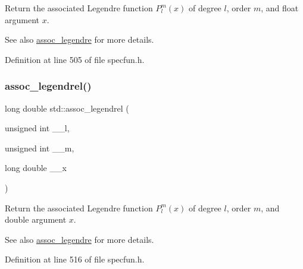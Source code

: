 Return the associated Legendre function $ P_l^m(x) $ of degree $ l $, order $ m $, and {\ttfamily float} argument $ x $.

\begin{DoxySeeAlso}{See also}
\hyperlink{group__cxx17__math__spec__func_ga7aa4182446f687094b12688078517d53}{assoc\+\_\+legendre} for more details. 
\end{DoxySeeAlso}


Definition at line 505 of file specfun.\+h.

\mbox{\label{group__cxx17__math__spec__func_ga55977b425a539146f060dec1c8003344}} 
\subsubsection{\texorpdfstring{assoc\+\_\+legendrel()}{assoc\_legendrel()}}
{\footnotesize\ttfamily long double std\+::assoc\+\_\+legendrel (\begin{DoxyParamCaption}\item[{unsigned int}]{\+\_\+\+\_\+l,  }\item[{unsigned int}]{\+\_\+\+\_\+m,  }\item[{long double}]{\+\_\+\+\_\+x }\end{DoxyParamCaption})\hspace{0.3cm}{\ttfamily [inline]}}

Return the associated Legendre function $ P_l^m(x) $ of degree $ l $, order $ m $, and { double} argument $ x $.

\begin{DoxySeeAlso}{See also}
\hyperlink{group__cxx17__math__spec__func_ga7aa4182446f687094b12688078517d53}{assoc\+\_\+legendre} for more details. 
\end{DoxySeeAlso}


Definition at line 516 of file specfun.\+h.

\mbox{\label{group__cxx17__math__spec__func_gacd36403ae64b89840b1504f97024dcee}} 
